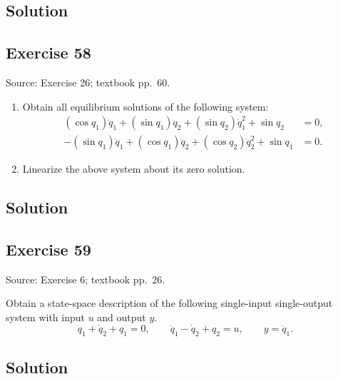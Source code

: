 \documentclass[12pt,a4paper]{article}
\newlength{\questionroom}
\newenvironment{questionprompt}{%
  \begin{lrbox}{\questionbox}\begin{minipage}{\linewidth}%
}{%
  \end{minipage}\end{lrbox}%
  \setlength{\questionroom}{\dimexpr\ht\questionbox+\dp\questionbox+5.2cm\relax}%
  \ifdim\questionroom>\textheight\setlength{\questionroom}{\textheight}\fi
  \Needspace{\questionroom}%
  \noindent\usebox{\questionbox}\par
}
\begin{document}
\subsection*{Solution}
\vspace{3.5cm}


\begin{questionprompt}
\section*{Exercise 58}
\label{practice:58}
{\small Source: Exercise 26; textbook pp.~60.}\par
\begin{enumerate}[label=(\alph*)]
\item Obtain all equilibrium solutions of the following system:
\begin{align*}
(\cos q_1)\ddot q_1+(\sin q_1)\ddot q_2+(\sin q_2)\dot q_1^2+\sin q_2&=0,\\
-(\sin q_1)\ddot q_1+(\cos q_1)\ddot q_2+(\cos q_2)\dot q_2^2+\sin q_1&=0.
\end{align*}
\item Linearize the above system about its zero solution.
\end{enumerate}
\end{questionprompt}
\subsection*{Solution}
\vspace{3.5cm}


\begin{questionprompt}
\section*{Exercise 59}
\label{practice:59}
{\small Source: Exercise 6; textbook pp.~26.}\par
Obtain a state-space description of the following single-input single-output system with input $u$ and output $y$.
\[\ddot q_1+\dot q_2+q_1=0,\qquad \ddot q_1-\dot q_2+q_2=u,\qquad y=\ddot q_1.\]
\end{questionprompt}
\subsection*{Solution}
\vspace{3.5cm}
\end{document}
